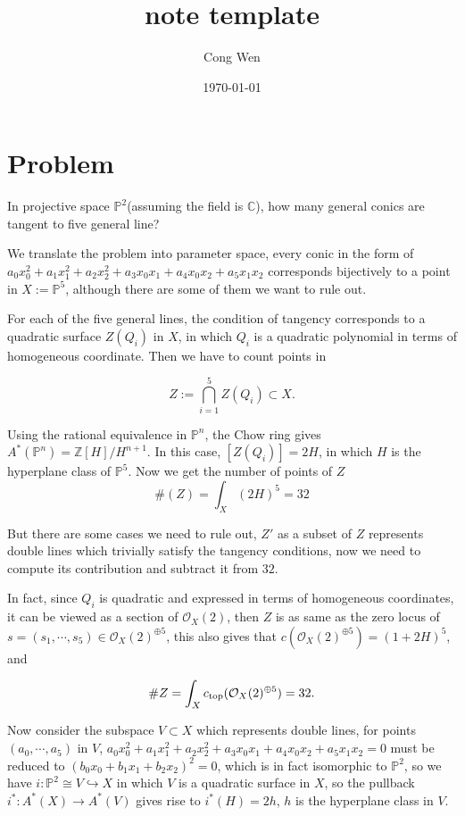 \documentclass[12pt]{article}
\title{note template}
\date{\today}
\author{Cong Wen}
\newcommand{\mbb}[1]{\mathbb{#1}}
\newcommand{\mcal}[1]{\mathcal{#1}}
\begin{document}
\maketitle
{}

\section{Problem}
In projective space $\mbb{P}^2$(assuming the field is $\mbb{C}$), how many general conics are tangent to five general line?

We translate the problem into parameter space, every conic in the form of $a_0x_0^2+a_1x_1^2+a_2x_2^2+a_3x_0x_1+a_4x_0x_2+a_5x_1x_2$ corresponds bijectively to a point in $X:=\mbb{P}^5$, although there are some of them we want to rule out.

For each of the five general lines, the condition of tangency corresponds to a quadratic surface $Z(Q_i)$ in $X$, in which $Q_i$ is a quadratic polynomial in terms of homogeneous coordinate. Then we have to count points in

$$Z:=\bigcap\limits_{i=1}^5Z(Q_i)\subset X.$$

Using the rational equivalence in $\mbb{P}^n$, the Chow ring gives $A^*(\mbb{P}^n)=\mbb{Z}[H]/H^{n+1}$. In this case, $[Z(Q_i)]=2H$, in which $H$ is the hyperplane class of $\mbb{P}^5$. Now we get the number of points of $Z$
$$\#(Z)=\int_{X}(2H)^5=32$$

But there are some cases we need to rule out, $Z'$ as a subset of $Z$ represents double lines which trivially satisfy the tangency conditions, now we need to compute its contribution and subtract it from $32$.


In fact, since $Q_i$ is quadratic and expressed in terms of homogeneous coordinates, it can be viewed as a section of $\mcal{O}_{X}(2)$, then $Z$ is as same as the zero locus of $s=(s_1,\cdots,s_5)\in\mcal{O}_{X}(2)^{\oplus 5}$, this also gives that $c(\mcal{O}_{X}(2)^{\oplus 5})=(1+2H)^5$, and

$$\#Z=\int_{X}c_{\rm{top}}(\mcal{O}_{X}(2)^{\oplus 5})=32.$$

Now consider the subspace $V\subset X$ which represents double lines, for points $(a_0,\cdots,a_5)$ in $V$, $a_0x_0^2+a_1x_1^2+a_2x_2^2+a_3x_0x_1+a_4x_0x_2+a_5x_1x_2=0$ must be reduced to $(b_0x_0+b_1x_1+b_2x_2)^2=0$, which is in fact isomorphic to $\mbb{P}^2$, so we have $i:\mbb{P}^2\cong V\hookrightarrow X$ in which $V$ is a quadratic surface in $X$, so the pullback $i^*:A^*(X)\rightarrow A^*(V)$ gives rise to $i^*(H)=2h$, $h$ is the hyperplane class in $V$.
\end{document}
